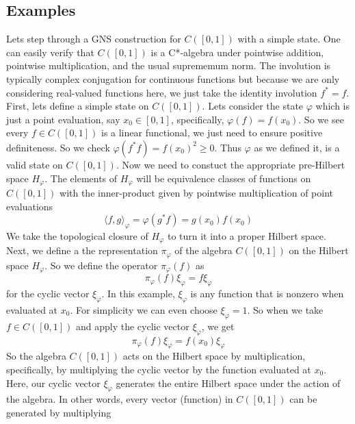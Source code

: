 \subsection{Examples}
\begin{example}
Lets step through a GNS construction for \( C([0,1]) \) with a simple state. One
can easily verify that $C([0,1])$ is a C*-algebra under pointwise addition, pointwise
multiplication, and the usual suprememum norm. The involution is typically complex
conjugation for continuous functions but because we are only considering real-valued
functions here, we just take the identity involution $f^*=f$. First, lets define a simple state
on $C([0,1])$. Lets consider the state $\varphi$ which is just a point evaluation,
say $x_0 \in [0,1]$, specifically, $\varphi(f) = f(x_0)$. So we see every $f \in C([0,1])$
is a linear functional, we just need to ensure positive definiteness. So we check
$\varphi(f^*f) = f(x_0)^2 \ge 0$. Thus $\varphi$ as we defined it, is a valid state
on $C([0,1])$. Now we need to constuct the appropriate pre-Hilbert space $H_\varphi$.
The elements of $H_\varphi$ will be equivalence classes of functions on $C([0,1])$
with the inner-product given by pointwise multiplication of point evaluations
\begin{equation*}
    \langle f,g \rangle_\varphi = \varphi(g^*f) = g(x_0)f(x_0)
\end{equation*}
We take the topological closure of $H_\varphi$ to turn it into a proper Hilbert space.
Next, we define a the representation $\pi_\varphi$ of the algebra $C([0,1])$ on
the Hilbert space $H_\varphi$. So we define the operator $\pi_\varphi (f)$ as
\begin{equation*}
    \pi_\varphi (f)\xi_\varphi = f \xi_\varphi
\end{equation*}
for the cyclic vector $\xi_\varphi$. In this example, $\xi_\varphi$ is any function
that is nonzero when evaluated at $x_0$. For simplicity we can even choose $\xi_\varphi = 1$.
So when we take $f \in C([0,1])$ and apply the cyclic vector $\xi_\varphi$, we get
\begin{equation*}
    \pi_\varphi (f) \xi_\varphi = f(x_0) \xi_\varphi
\end{equation*}
So the algebra $C([0,1])$ acts on the Hilbert space by multiplication, specifically,
by multiplying the cyclic vector by the function evaluated at $x_0$. Here, our cyclic
vector $\xi_\varphi$ generates the entire Hilbert space under the action of the algebra.
In other words, every vector (function) in $C([0,1])$ can be generated by multiplying

\end{example}
